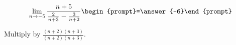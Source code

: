 \documentclass{ximera}
\author{Bart Snapp}
\begin{document}
\begin{exercise}

\[
	\lim_{n\to -5 } \frac{n+5}{\frac{2}{n+3}-\frac{3}{n+2}}  \begin{prompt}=\answer{-6}\end{prompt}
\]
\begin{hint}
Multiply by $\frac{(n+2) (n+3)}{(n+2) (n+3)}$.
\end{hint}
\end{exercise}
\end{document}
